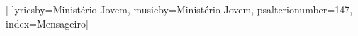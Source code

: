 %

\setcounter{songnum}{147}

[
lyricsby={Ministério Jovem}, 
musicby={Ministério Jovem},
psalterionumber=147,
index={Mensageiro}]


\beginverse*
{\nolyrics Intro: \[F#m] \[D]  \[A] \[E] \[D] \[E] \[A]}
\endverse

